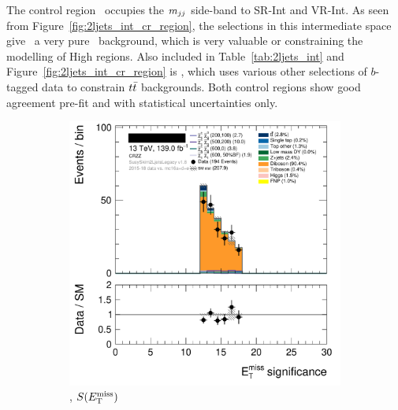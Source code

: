 The control region \crvz\ occupies the $m_{jj}$ side-band to
SR-Int and VR-Int.
As seen from Figure~\ref{fig:2ljets_int_cr_region}, the selections in this
intermediate space give \crvz\ a very pure \diboson\ background, which is very
valuable or constraining the modelling of High regions.
Also included in Table~\ref{tab:2ljets_int} and
Figure~\ref{fig:2ljets_int_cr_region} is \crtt, which uses various other
selections of $b$-tagged data to constrain $t\bar t$ backgrounds.
Both control regions show good agreement pre-fit and with statistical uncertainties
only.
\begin{figure}[tp]
\centering
\begin{subfigure}{0.48\textwidth}
\centering
\includegraphics[width=\textwidth]{figures/2ljets_def_met_Sign_CRZZ.png}
\caption{\crvz, $S(E_\mathrm{T}^\mathrm{miss})$}
\end{subfigure}
\hfill
\begin{subfigure}{0.48\textwidth}
\centering

\end{subfigure}
\end{figure}
